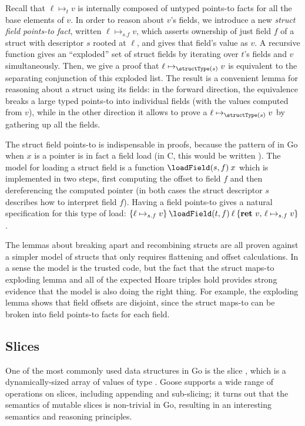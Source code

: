 Recall that $\ell \mapsto_t v$ is internally composed of untyped
points-to facts for all the base elements of $v$. In order to reason
about $v$'s fields, we introduce a new \emph{struct field points-to fact},
written $\ell \mapsto_{s.f} v$, which asserts ownership of just field
$f$ of a struct with descriptor $s$ rooted at $\ell$, and gives that field's
value as $v$. A recursive function gives an ``exploded'' set of struct
fields by iterating over $t$'s fields and $v$ simultaneously. Then,
we give a proof that $\ell \mapsto_{\structType(s)} v$ is equivalent to the separating
conjunction of this exploded list. The result is a convenient lemma for
reasoning about a struct using its fields: in the forward direction, the
equivalence breaks a large typed points-to into individual fields (with
the values computed from $v$), while in the other direction it allows
to prove a $\ell \mapsto_{\structType(s)} v$ by gathering up all the fields.

The struct field points-to is indispensable in proofs, because the
pattern of  in Go when $x$ is a pointer is in fact a field
load (in C, this would be written ). The model
for loading a struct field is a function $\loadField(s, f) \app x$
which is implemented in two steps, first computing the offset to field
$f$ and then dereferencing the computed pointer (in both cases the struct descriptor $s$
describes how to interpret field $f$). Having a field points-to gives
a natural specification for this type of load:
$\hoare{\ell \mapsto_{s.f} v}{\loadField(t, f) \app \ell}{\Ret{v} \ell \mapsto_{s.f} v}$.

The lemmas about breaking apart and recombining structs are all proven
against a simpler model of structs that only requires flattening and
offset calculations. In a sense the model is the trusted code, but the
fact that the struct maps-to exploding lemma and all of the
expected Hoare triples hold provides strong evidence that the model is
also doing the right thing. For example, the exploding lemma shows that
field offsets are disjoint, since the struct maps-to can be broken into
field points-to facts for each field.

\subsection{Slices}%
\label{sec:goose:slices}

One of the most commonly used data structures in Go is the slice
, which is a dynamically-sized array of values of type
. Goose supports a wide range of operations on slices,
including appending and sub-slicing; it turns out that the semantics of
mutable slices is non-trivial in Go, resulting in an interesting
semantics and reasoning principles.

